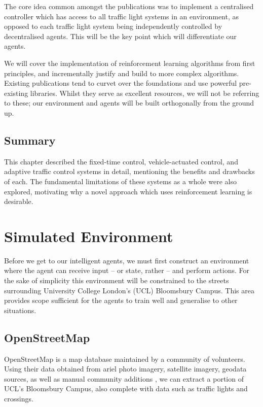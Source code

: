 \documentclass[a4paper]{report}
\begin{document}
The core idea common amongst the publications was to implement a centralised controller which has access to all traffic light systems in an environment, as opposed to each traffic light system being independently controlled by decentralised agents. This will be the key point which will differentiate our agents.

We will cover the implementation of reinforcement learning algorithms from first principles, and incrementally justify and build to more complex algorithms. Existing publications tend to curvet over the foundations and use powerful pre-existing libraries. Whilst they serve as excellent resources, we will not be referring to these; our environment and agents will be built orthogonally from the ground up.

\section{Summary}

This chapter described the fixed-time control, vehicle-actuated control, and adaptive traffic control systems in detail, mentioning the benefits and drawbacks of each. The fundamental limitations of these systems as a whole were also explored, motivating why a novel approach which uses reinforcement learning is desirable.

\chapter{Simulated Environment} \label{chapter:simulated_environment}

Before we get to our intelligent agents, we must first construct an environment where the agent can receive input -- or state, rather -- and perform actions. For the sake of simplicity this environment will be constrained to the streets surrounding University College London's (UCL) Bloomsbury Campus. This area provides scope sufficient for the agents to train well and generalise to other situations.

\section{OpenStreetMap}
OpenStreetMap is a map database maintained by a community of volunteers. Using their data obtained from ariel photo imagery, satellite imagery, geodata sources, as well as manual community additions \cite{HaklayWeberOSM08}, we can extract a portion of UCL's Bloomsbury Campus\footnotemark{}, also complete with data such as traffic lights and crossings.
\end{document}

